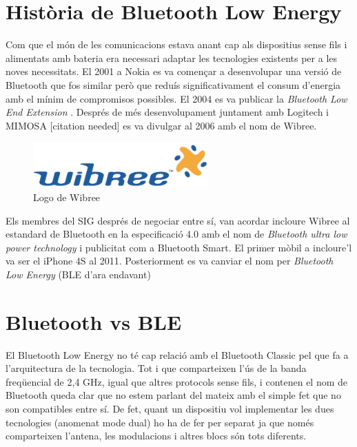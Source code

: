\section{Història de Bluetooth Low Energy}
Com que el món de les comunicacions estava anant cap als dispositius sense fils i alimentats amb bateria era necessari adaptar les tecnologies existents per a les noves necessitats.
El 2001 a Nokia es va començar a desenvolupar una versió de Bluetooth que fos similar però que reduís significativament el consum d'energia amb el mínim de compromisos possibles.
El 2004 es va publicar la \textit{Bluetooth Low End Extension} \cite{Original_BLE_Extension}. 
Després de més desenvolupament juntament amb Logitech i MIMOSA [citation needed] es va divulgar al 2006 amb el nom de Wibree.

\begin{figure}
	\begin{center}
		\includegraphics[width=0.6\textwidth]{./images/Wibree_Logo.png}
		\caption{Logo de Wibree }
	\end{center}
\end{figure}

Els membres del SIG després de negociar entre sí, van acordar incloure Wibree al estandard de Bluetooth en la especificació 4.0 amb el nom de \textit{Bluetooth ultra low power technology} i publicitat com a Bluetooth Smart. El primer mòbil a incloure'l va ser el iPhone 4S al 2011.
Posteriorment es va canviar el nom per \textit{Bluetooth Low Energy} (BLE d'ara endavant)

\section{Bluetooth vs BLE}
El Bluetooth Low Energy no té cap relació amb el Bluetooth Classic pel que fa a l'arquitectura de la tecnologia.
Tot i que comparteixen l'ús de la banda freqüencial de 2,4 GHz, igual que altres protocols sense fils, i contenen el nom de Bluetooth queda clar que no estem parlant del mateix amb el simple fet que no son compatibles entre sí.
De fet, quant un dispositiu vol implementar les dues tecnologies (anomenat mode dual) ho ha de fer per separat ja que només comparteixen l'antena, les modulacions i altres blocs són tots diferents.

